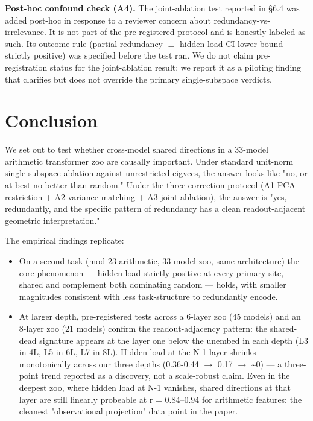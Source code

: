 \textbf{Post-hoc confound check (A4).} The joint-ablation test reported in
\S{}6.4 was added post-hoc in response to a reviewer concern about
redundancy-vs-irrelevance. It is not part of the pre-registered
protocol and is honestly labeled as such. Its outcome rule (partial
redundancy $\equiv$ hidden-load CI lower bound strictly positive) was specified
before the test ran. We do not claim pre-registration status for the
joint-ablation result; we report it as a piloting finding that clarifies
but does not override the primary single-subspace verdicts.


\section{Conclusion}

We set out to test whether cross-model shared directions in a 33-model
arithmetic transformer zoo are causally important. Under standard
unit-norm single-subspace ablation against unrestricted eigvecs, the
answer looks like "no, or at best no better than random." Under the
three-correction protocol (A1 PCA-restriction + A2 variance-matching +
A3 joint ablation), the answer is "yes, redundantly, and the specific
pattern of redundancy has a clean readout-adjacent geometric
interpretation."

The empirical findings replicate:
\begin{itemize}
  \item On a second task (mod-23 arithmetic, 33-model zoo, same architecture) the core phenomenon --- hidden load strictly positive at every primary site, shared and complement both dominating random --- holds, with smaller magnitudes consistent with less task-structure to redundantly encode.
  \item At larger depth, pre-registered tests across a 6-layer zoo (45 models) and an 8-layer zoo (21 models) confirm the readout-adjacency pattern: the shared-dead signature appears at the layer one below the unembed in each depth (L3 in 4L, L5 in 6L, L7 in 8L). Hidden load at the N-1 layer shrinks monotonically across our three depths (0.36-0.44 $\to$ 0.17 $\to$ \textasciitilde{}0) --- a three-point trend reported as a discovery, not a scale-robust claim. Even in the deepest zoo, where hidden load at N-1 vanishes, shared directions at that layer are still linearly probeable at r = 0.84--0.94 for arithmetic features: the cleanest "observational projection" data point in the paper.
\end{itemize}

